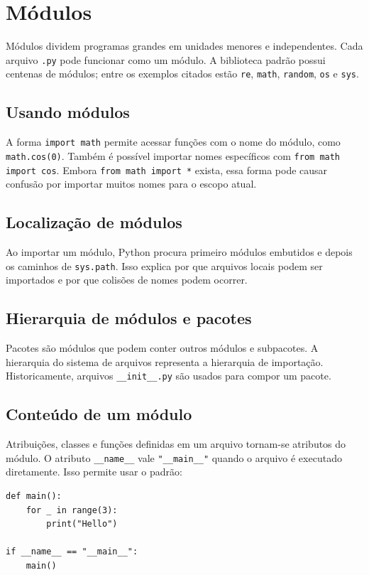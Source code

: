 \documentclass[11pt,a4paper]{article}
\begin{document}
\section{Módulos}
Módulos dividem programas grandes em unidades menores e independentes. Cada arquivo \texttt{.py} pode funcionar como um módulo. A biblioteca padrão possui centenas de módulos; entre os exemplos citados estão \texttt{re}, \texttt{math}, \texttt{random}, \texttt{os} e \texttt{sys}.

\subsection{Usando módulos}
A forma \texttt{import math} permite acessar funções com o nome do módulo, como \texttt{math.cos(0)}. Também é possível importar nomes específicos com \texttt{from math import cos}. Embora \texttt{from math import *} exista, essa forma pode causar confusão por importar muitos nomes para o escopo atual.

\subsection{Localização de módulos}
Ao importar um módulo, Python procura primeiro módulos embutidos e depois os caminhos de \texttt{sys.path}. Isso explica por que arquivos locais podem ser importados e por que colisões de nomes podem ocorrer.

\subsection{Hierarquia de módulos e pacotes}
Pacotes são módulos que podem conter outros módulos e subpacotes. A hierarquia do sistema de arquivos representa a hierarquia de importação. Historicamente, arquivos \texttt{\_\_init\_\_.py} são usados para compor um pacote.

\subsection{Conteúdo de um módulo}
Atribuições, classes e funções definidas em um arquivo tornam-se atributos do módulo. O atributo \texttt{\_\_name\_\_} vale \texttt{"\_\_main\_\_"} quando o arquivo é executado diretamente. Isso permite usar o padrão:

\begin{lstlisting}
def main():
    for _ in range(3):
        print("Hello")

if __name__ == "__main__":
    main()
\end{lstlisting}
\end{document}
